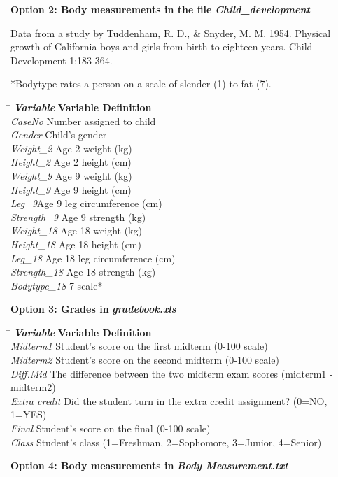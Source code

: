 \newpage
\textbf{\large{}Option 2: Body measurements in the file}\textbf{\emph{\large{}
Child\_development}}{\large \par}

Data from a study by Tuddenham, R. D., \& Snyder, M. M. 1954. Physical
growth of California boys and girls from birth to eighteen years.
Child Development 1:183-364.

{*}Bodytype rates a person on a scale of slender (1) to fat (7). 

\begin{tabbing}
\hspace*{1.2in}\=\kill
\textbf{\emph{Variable}}\> \textbf{Variable Definition}\\
\emph{CaseNo}\>  Number assigned to child\\
\emph{Gender}\>  Child's gender\\
\emph{Weight\_2}\>  Age 2 weight (kg)\\
\emph{Height\_2}\>  Age 2 height (cm)\\
\emph{Weight\_9}\>  Age 9 weight (kg)\\
\emph{Height\_9}\>  Age 9 height (cm)\\
\emph{Leg\_9}\>Age 9 leg circumference (cm)\\
\emph{Strength\_9}\>  Age 9 strength (kg)\\
\emph{Weight\_18}\>  Age 18 weight (kg)\\
\emph{Height\_18}\>  Age 18 height (cm)\\
\emph{Leg\_18}\> Age 18 leg circumference (cm)\\
\emph{Strength\_18}\>  Age 18 strength (kg)\\
\emph{Bodytype\_18}-7 scale{*} 
\end{tabbing}

\bigskip
\bigskip
\textbf{\large{}Option 3: Grades in }\textbf{\emph{\large{}gradebook.xls}}{\large \par}

\begin{tabbing}
\hspace*{1.2in}\=\kill
\textbf{\emph{Variable}}\> \textbf{Variable Definition}\\
\emph{Midterm1}\>  Student\textquoteright s score on the first midterm
(0-100 scale) \\
\emph{Midterm2}\>  Student\textquoteright s score on the second midterm
(0-100 scale) \\
\emph{Diff.Mid}\>  The difference between the two midterm exam scores
(midterm1 - midterm2)\\ 
\emph{Extra credit}\>  Did the student turn in the extra credit assignment?
(0=NO, 1=YES) \\
\emph{Final}\>  Student's score on the final (0-100 scale) \\
\emph{Class}\>  Student's class (1=Freshman, 2=Sophomore, 3=Junior, 4=Senior) 
\end{tabbing}
\newpage
\textbf{\large{}Option 4: Body measurements in }\textbf{\emph{\large{}Body
Measurement.txt}}{\large \par}

